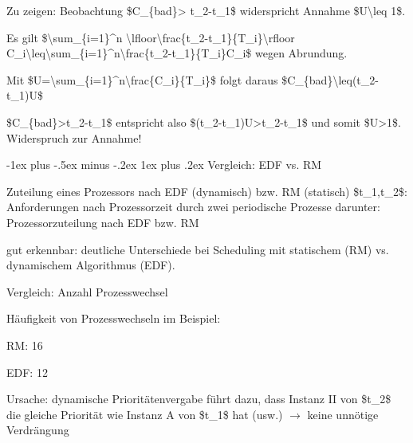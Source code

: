 \documentclass[a4paper]{article}
\makeatletter
\renewcommand{\subsubsection}{\@startsection{subsubsection}{3}{0mm}%
 {-1ex plus -.5ex minus -.2ex}%
 {1ex plus .2ex}%
 {\normalfont\small\bfseries}}
\makeatother
\begin{document}
\begin{multicols}{3}
\begin{itemize*}
\begin{itemize*}
\begin{itemize*}
                \item Zu zeigen: Beobachtung \$C\_\{bad\}\textgreater{} t\_2-t\_1\$ widerspricht Annahme \$U\textbackslash leq 1\$.
                \item Es gilt \$\textbackslash sum\_\{i=1\}\^{}n \textbackslash lfloor\textbackslash frac\{t\_2-t\_1\}\{T\_i\}\textbackslash rfloor C\_i\textbackslash leq\textbackslash sum\_\{i=1\}\^{}n\textbackslash frac\{t\_2-t\_1\}\{T\_i\}C\_i\$ wegen Abrundung.
                \item Mit \$U=\textbackslash sum\_\{i=1\}\^{}n\textbackslash frac\{C\_i\}\{T\_i\}\$ folgt daraus \$C\_\{bad\}\textbackslash leq(t\_2-t\_1)U\$
                \item \$C\_\{bad\}\textgreater t\_2-t\_1\$ entspricht also \$(t\_2-t\_1)U\textgreater t\_2-t\_1\$ und somit \$U\textgreater1\$. Widerspruch zur Annahme!
            \end{itemize*}
        \end{itemize*}
    \end{itemize*}


    \subsubsection{Vergleich: EDF vs. RM}

    Zuteilung eines Prozessors nach EDF (dynamisch) bzw. RM (statisch)
    \$t\_1,t\_2\$: Anforderungen nach Prozessorzeit durch zwei periodische
    Prozesse darunter: Prozessorzuteilung nach EDF bzw. RM

    \begin{itemize*}
        \item
        gut erkennbar: deutliche Unterschiede bei Scheduling mit statischem
        (RM) vs. dynamischem Algorithmus (EDF).
    \end{itemize*}

    Vergleich: Anzahl Prozesswechsel

    \begin{itemize*}
        \item
        Häufigkeit von Prozesswechseln im Beispiel:
        \begin{itemize*}
            \item RM: 16
            \item EDF: 12
        \end{itemize*}
        \item
        Ursache: dynamische Prioritätenvergabe führt dazu, dass Instanz II von
        \$t\_2\$ die gleiche Priorität wie Instanz A von \$t\_1\$ hat (usw.)
        $\rightarrow$ keine unnötige Verdrängung
    \end{itemize*}


\end{multicols}
\end{document}
